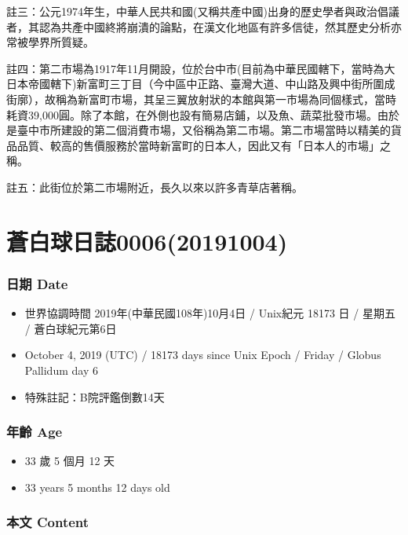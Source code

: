 \documentclass[a5paper, 12pt
]{book}
\providecommand{\tightlist}{%
  \setlength{\itemsep}{0pt}\setlength{\parskip}{0pt}}
\begin{document}
註三：公元1974年生，中華人民共和國(又稱共產中國)出身的歷史學者與政治倡議者，其認為共產中國終將崩潰的論點，在漢文化地區有許多信徒，然其歷史分析亦常被學界所質疑。

註四：第二市場為1917年11月開設，位於台中市(目前為中華民國轄下，當時為大日本帝國轄下)新富町三丁目（今中區中正路、臺灣大道、中山路及興中街所圍成街廓），故稱為新富町市場，其呈三翼放射狀的本館與第一市場為同個樣式，當時耗資39,000圓。除了本館，在外側也設有簡易店鋪，以及魚、蔬菜批發市場。由於是臺中市所建設的第二個消費市場，又俗稱為第二市場。第二市場當時以精美的貨品品質、較高的售價服務於當時新富町的日本人，因此又有「日本人的市場」之稱。

註五：此街位於第二市場附近，長久以來以許多青草店著稱。

\hypertarget{ux84bcux767dux7403ux65e5ux8a8c000620191004}{%
\section{蒼白球日誌0006(20191004)}\label{ux84bcux767dux7403ux65e5ux8a8c000620191004}}

\hypertarget{ux65e5ux671f-date-3}{%
\subsubsection{日期 Date}\label{ux65e5ux671f-date-3}}

\begin{itemize}
\tightlist
\item
  世界協調時間 2019年(中華民國108年)10月4日 / Unix紀元 18173 日 / 星期五
  / 蒼白球紀元第6日
\item
  October 4, 2019 (UTC) / 18173 days since Unix Epoch / Friday / Globus
  Pallidum day 6
\item
  特殊註記：B院評鑑倒數14天
\end{itemize}

\hypertarget{ux5e74ux9f61-age-3}{%
\subsubsection{年齡 Age}\label{ux5e74ux9f61-age-3}}

\begin{itemize}
\tightlist
\item
  33 歲 5 個月 12 天
\item
  33 years 5 months 12 days old
\end{itemize}

\hypertarget{ux672cux6587-content-3}{%
\subsubsection{本文 Content}\label{ux672cux6587-content-3}}
\end{document}
